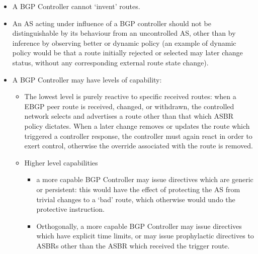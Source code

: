 \begin{itemize}
	\item A BGP Controller cannot `invent' routes.

	\item An AS acting under influence of a BGP controller should not be distinguishable by its behaviour from an uncontrolled AS, other than by inference by observing better or dynamic policy (an example of dynamic policy would be that a route initially rejected or selected may later change status, without any corresponding external route state change).

	\item A BGP Controller may have levels of capability:
	      \begin{itemize}
		      \item The lowest level is purely reactive to specific received routes: when a EBGP peer route is received, changed, or withdrawn, the controlled network selects and advertises a route other than that which ASBR policy dictates. When a later change removes or updates the route which triggered a controller response, the controller must again react in order to exert control, otherwise the override associated with the route is removed.

		      \item  Higher level capabilities

		            \begin{itemize}
			            \item  a more capable BGP Controller may issue directives which are generic or persistent: this would have the effect of protecting the AS from trivial changes to a `bad' route, which otherwise would undo the protective instruction.
			            \item  Orthogonally, a more capable BGP Controller may issue directives which have explicit time limits, or may issue prophylactic directives to ASBRs other than the ASBR which received the trigger route.
		            \end{itemize}
	      \end{itemize}
\end{itemize}

